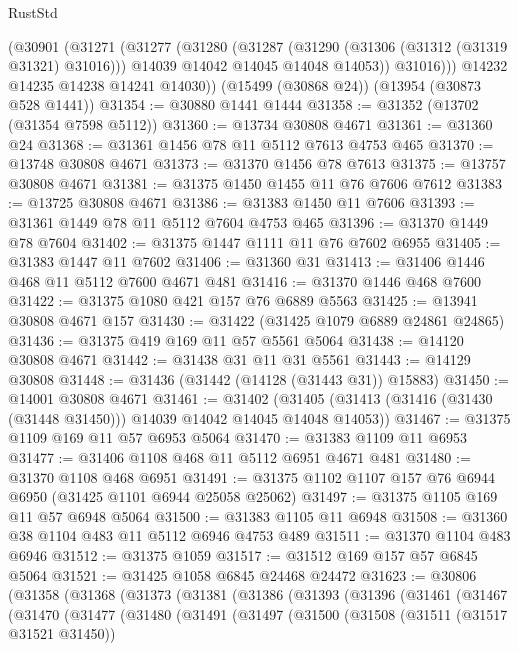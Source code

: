 \begin{lexlean}{RustStd}
\begin{coremodule}
        (@30901
          (@31271
            (@31277
              (@31280
                (@31287
                  (@31290 (@31306 (@31312 (@31319 @31321) @31016)))
                  @14039
                  @14042
                  @14045
                  @14048
                  @14053))
              @31016)))
        @14232
        @14235
        @14238
        @14241
        @14030))
    (@15499 (@30868 @24))
    (@13954 (@30873 @528 @1441))
@31354 := @30880 @1441 @1444
@31358 := @31352 (@13702 (@31354 @7598 @5112))
@31360 := @13734 @30808 @4671
@31361 := @31360 @24
@31368 := @31361 @1456 @78 @11 @5112 @7613 @4753 @465
@31370 := @13748 @30808 @4671
@31373 := @31370 @1456 @78 @7613
@31375 := @13757 @30808 @4671
@31381 := @31375 @1450 @1455 @11 @76 @7606 @7612
@31383 := @13725 @30808 @4671
@31386 := @31383 @1450 @11 @7606
@31393 := @31361 @1449 @78 @11 @5112 @7604 @4753 @465
@31396 := @31370 @1449 @78 @7604
@31402 := @31375 @1447 @1111 @11 @76 @7602 @6955
@31405 := @31383 @1447 @11 @7602
@31406 := @31360 @31
@31413 := @31406 @1446 @468 @11 @5112 @7600 @4671 @481
@31416 := @31370 @1446 @468 @7600
@31422 := @31375 @1080 @421 @157 @76 @6889 @5563
@31425 := @13941 @30808 @4671 @157
@31430 := @31422 (@31425 @1079 @6889 @24861 @24865)
@31436 := @31375 @419 @169 @11 @57 @5561 @5064
@31438 := @14120 @30808 @4671
@31442 := @31438 @31 @11 @31 @5561
@31443 := @14129 @30808
@31448 := @31436 (@31442 (@14128 (@31443 @31)) @15883)
@31450 := @14001 @30808 @4671
@31461 := @31402
    (@31405 (@31413 (@31416 (@31430 (@31448 @31450))) @14039 @14042 @14045 @14048 @14053))
@31467 := @31375 @1109 @169 @11 @57 @6953 @5064
@31470 := @31383 @1109 @11 @6953
@31477 := @31406 @1108 @468 @11 @5112 @6951 @4671 @481
@31480 := @31370 @1108 @468 @6951
@31491 := @31375 @1102 @1107 @157 @76 @6944 @6950 (@31425 @1101 @6944 @25058 @25062)
@31497 := @31375 @1105 @169 @11 @57 @6948 @5064
@31500 := @31383 @1105 @11 @6948
@31508 := @31360 @38 @1104 @483 @11 @5112 @6946 @4753 @489
@31511 := @31370 @1104 @483 @6946
@31512 := @31375 @1059
@31517 := @31512 @169 @157 @57 @6845 @5064
@31521 := @31425 @1058 @6845 @24468 @24472
@31623 := @30806
    (@31358
      (@31368
        (@31373
          (@31381
            (@31386
              (@31393
                (@31396
                  (@31461
                    (@31467
                      (@31470
                        (@31477
                          (@31480
                            (@31491
                              (@31497
                                (@31500
                                  (@31508
                                    (@31511 (@31517 @31521 @31450))

\end{coremodule}
\end{lexlean}
